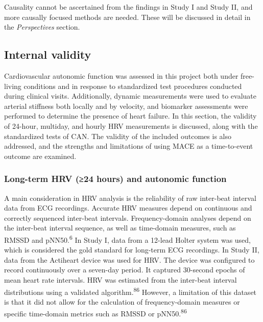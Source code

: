 \documentclass[
  a4paper,
  headsepline=true,
  open=any]{scrbook}
\begin{document}
Causality cannot be ascertained from the findings in Study I and Study
II, and more causally focused methods are needed. These will be
discussed in detail in the \emph{Perspectives} section.

\hypertarget{internal-validity}{%
\subsection{Internal validity}\label{internal-validity}}

Cardiovascular autonomic function was assessed in this project both
under free-living conditions and in response to standardized test
procedures conducted during clinical visits. Additionally, dynamic
measurements were used to evaluate arterial stiffness both locally and
by velocity, and biomarker assessments were performed to determine the
presence of heart failure. In this section, the validity of 24-hour,
multiday, and hourly HRV measurements is discussed, along with the
standardized tests of CAN. The validity of the included outcomes is also
addressed, and the strengths and limitations of using MACE as a
time-to-event outcome are examined.

\hypertarget{long-term-hrv-24-hours-and-autonomic-function}{%
\subsubsection{Long-term HRV (≥24 hours) and autonomic
function}\label{long-term-hrv-24-hours-and-autonomic-function}}

A main consideration in HRV analysis is the reliability of raw
inter-beat interval data from ECG recordings. Accurate HRV measures
depend on continuous and correctly sequenced inter-beat intervals.
Frequency-domain analyses depend on the inter-beat interval sequence, as
well as time-domain measures, such as RMSSD and
pNN50.\textsuperscript{6} In Study I, data from a 12-lead Holter system
was used, which is considered the gold standard for long-term ECG
recordings. In Study II, data from the Actiheart device was used for
HRV. The device was configured to record continuously over a seven-day
period. It captured 30-second epochs of mean heart rate intervals. HRV
was estimated from the inter-beat interval distributions using a
validated algorithm.\textsuperscript{86} However, a limitation of this
dataset is that it did not allow for the calculation of frequency-domain
measures or specific time-domain metrics such as RMSSD or
pNN50.\textsuperscript{86}
\end{document}
